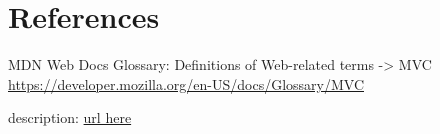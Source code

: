 \documentclass[table, 12pt]{article}
\begin{document}
\section{References}


\begin{thebibliography}{9}
    MDN Web Docs Glossary: Definitions of Web-related terms -> MVC
    \url{https://developer.mozilla.org/en-US/docs/Glossary/MVC}

    description: \url{url here}
    
\end{thebibliography}
\end{document}
